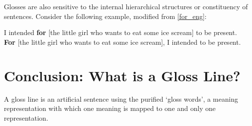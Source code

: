 Glosses are also sensitive to the internal hierarchical structures or constituency of sentences. Consider the following example, modified from \ref{for_eng}:

\begin{exe}
\ex
	\begin{xlist}
	\ex \label{for_c}I intended \textbf{for} [the little girl who wants to eat some ice scream] to be present.
	\ex \label{for_p}\textbf{For} [the little girl who wants to eat some ice scream], I intended to be present. 
	\end{xlist}
\end{exe}



\section{Conclusion: What is a Gloss Line?} 
A gloss line is an artificial sentence using the purified `gloss words', a meaning representation with which one meaning is mapped to one and only one representation. 


